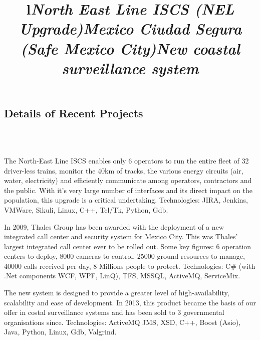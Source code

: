 \documentclass[overlapped,line,letterpaper]{res}
\begin{document}
\begin{resume}


  \section{\bf Details of Recent Projects}

  \begin{format}
    \title{l}\\
    \body\\
  \end{format}

  \title{\em North East Line ISCS (NEL Upgrade)}
  \begin{position}
    The North-East Line ISCS enables only 6 operators to run the entire fleet of
    32 driver-less trains, monitor the 40km of tracks, the various energy
    circuits (air, water, electricity) and efficiently communicate among
    operators, contractors and the public. With it's very large number of
    interfaces and its direct impact on the population, this upgrade is a
    critical undertaking.
    \newline
    Technologies: JIRA, Jenkins, VMWare, Sikuli, Linux, C++, Tcl/Tk, Python, Gdb.
  \end{position}

  \title{\em Mexico Ciudad Segura (Safe Mexico City)}
  \begin{position}
    In 2009, Thales Group has been awarded with the deployment of a new
    integrated call center and security system for Mexico City.  This was
    Thales' largest integrated call center ever to be rolled out. Some key
    figures: 6 operation centers to deploy, 8000 cameras to control, 25000
    ground resources to manage, 40000 calls received per day, 8 Millions people
    to protect.
    \newline
    Technologies: C\# (with .Net components WCF, WPF, LinQ), TFS, MSSQL, ActiveMQ,
    ServiceMix.
  \end{position}

  \title{\em New coastal surveillance system}
  \begin{position}
    The new system is designed to provide a greater level of high-availability,
    scalability and ease of development. In 2013, this product became the basis
    of our offer in costal surveillance systems and has been sold to 3
    governmental organisations since.
    \newline
    Technologies: ActiveMQ JMS, XSD, C++, Boost (Asio), Java, Python, Linux,
    Gdb, Valgrind.
  \end{position}


\end{resume}
\end{document}
